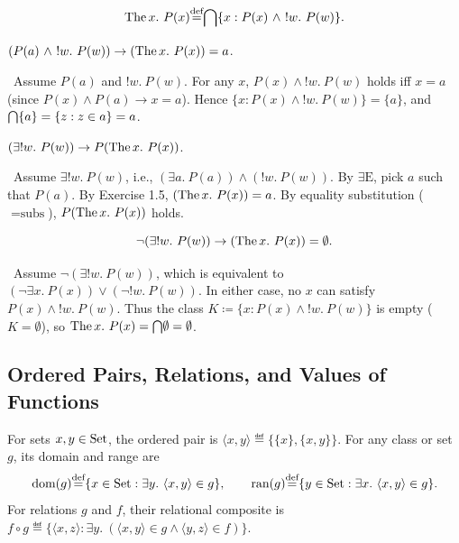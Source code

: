 \documentclass[10pt,a4paper]{article}
\begin{document}
\begin{definition}
$$\The x.\ P(x) \eqdef \inter \{x : P(x)\ \land\ !w.\ P(w)\}.$$
\end{definition}

\begin{exercise}
$(P(a)\ \land\ !w.\ P(w)) \to (\The x.\ P(x))=a$.
\end{exercise}
\myprf\ Assume $P(a)$ and $!w.\ P(w)$. For any $x$, $P(x) \land !w.\ P(w)$ holds iff $x = a$ (since $P(x) \land P(a) \to x=a$). Hence $\{x : P(x) \land !w.\ P(w)\} = \{a\}$, and ${\bigcap} \{a\} = \{z : z \in a\} = a$. \myqed

\begin{exercise}
$(\exists !w.\ P(w)) \to P(\The x.\ P(x))$.
\end{exercise}
\myprf\ Assume $\exists !w.\ P(w)$, i.e., $(\exists a.\ P(a)) \land (!w.\ P(w))$. By $\exists\textrm{E}$, pick $a$ such that $P(a)$. By Exercise 1.5, $({\textrm{The\,}} x.\ P(x)) = a$. By equality substitution ($=\textrm{subs}$), $P({\textrm{The\,}} x.\ P(x))$ holds. \myqed

\begin{lemma}
$$\neg (\exists !w.\ P(w)) \to (\The x.\ P(x)) = \emptyset.$$
\end{lemma}
\myprf\ Assume $\neg (\exists !w.\ P(w))$, which is equivalent to $(\neg \exists x.\ P(x)) \lor (\neg !w.\ P(w))$. In either case, no $x$ can satisfy $P(x) \land !w.\ P(w)$. Thus the class $K \coloneqq \{x : P(x) \land !w.\ P(w)\}$ is empty ($K = \emptyset$), so ${\textrm{The\,}} x.\ P(x) = {\bigcap} \emptyset = \emptyset$. \myqed

\subsection{Ordered Pairs, Relations, and Values of Functions}
\begin{definition}
For sets $x, y \in {\textrm{Set}}$, the ordered pair is $\langle x, y \rangle \eqdef \{\{x\}, \{x, y\}\}$. For any class or set $g$, its domain and range are
$${\textrm{dom}}(g) {\stackrel{{\textrm{def}}}{=}} \{x \in {\textrm{Set}} : \exists y.\ \langle x, y \rangle \in g\}, \qquad \textrm{ran}(g) {\stackrel{{\textrm{def}}}{=}} \{y \in {\textrm{Set}} : \exists x.\ \langle x, y \rangle \in g\}.$$
For relations $g$ and $f$, their relational composite is $f \circ g \eqdef \{\langle x, z \rangle : \exists y.\ (\langle x, y \rangle \in g \land \langle y, z \rangle \in f)\}$.
\end{definition}
\end{document}
